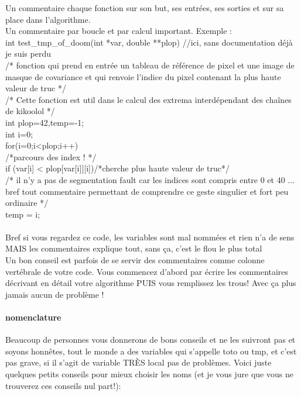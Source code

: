 Un commentaire chaque fonction sur son but, ses entrées, ses sorties et sur sa place dans l'algorithme. \\

Un commentaire par boucle et par calcul important. Exemple :\\

int test\_tmp\_of\_doom(int *var, double **plop) //ici, sans documentation déjà je suis perdu \\ 
/* fonction qui prend en entrée un tableau de référence de pixel et une image de masque de covariance
 et qui renvoie l'indice du pixel contenant la plus haute valeur de truc */\\
/* Cette fonction est util dans le calcul des extrema interdépendant des chaînes de kikoolol */\\

int plop=42,temp=-1;\\
int i=0;\\

for(i=0;i<plop;i++){\\ 
/*parcours des index ! */\\
if (var[i] < plop[var[i]][i])/*cherche plus haute valeur de truc*/\\
/* il n'y a pas de segmentation fault car les indices sont compris entre 0 et 40 ... bref tout
 commentaire permettant de comprendre ce geste singulier et fort peu ordinaire */\\
temp = i;\\
}\\

Bref si vous regardez ce code, les variables sont mal nommées et rien n'a de sens MAIS les
 commentaires explique tout, sans ça, c'est le flou le plus total\\
Un bon conseil est parfois de se servir des commentaires comme colonne vertébrale de votre 
code. Vous commencez d'abord par écrire les commentaires décrivant en détail votre algorithme 
PUIS vous remplissez les trous! Avec ça plus jamais aucun de problème ! \\

\paragraph{nomenclature}

Beaucoup de personnes vous donnerons de bons conseils et ne les suivront pas et soyons honnêtes, 
tout le monde a des variables qui s'appelle toto ou tmp, et c'est pas grave, si il s'agit de 
variable TRÈS local pas de problèmes. Voici juste quelques petits conseils pour mieux choisir 
les noms (et je vous jure que vous ne trouverez ces conseils nul part!):\\

